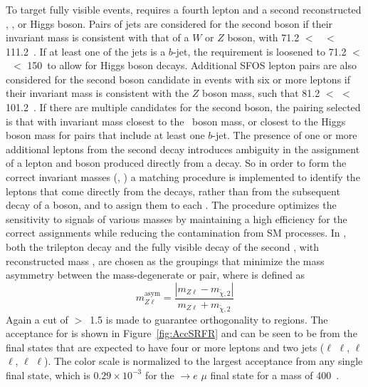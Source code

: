 \subsubsection{\SRFR}
\label{sec:srfr}
To target fully visible events, \SRTL requires a fourth lepton and a second reconstructed \Zboson, \Wboson, or Higgs boson.
Pairs of jets are considered for the second boson if their invariant mass \mjj is consistent with that of a $W$ or $Z$ boson, with 71.2 $<$ \mjj\ $<$ 111.2~\GeV.
If at least one of the jets is a $b$-jet, the \mjj requirement is loosened to 71.2 $<$ \mjj\ $<$ 150~\GeV to allow for Higgs boson decays.
Additional SFOS lepton pairs are also considered for the second boson candidate in events with six or more leptons if their invariant mass is consistent with the $Z$ boson mass, such that 81.2 $<$ \mll $<$ 101.2~\GeV.
If there are multiple candidates for the second boson, the pairing selected is that with invariant mass closest to the \Zboson\ boson mass, or closest to the Higgs boson mass for pairs that include at least one $b$-jet.
The presence of one or more additional leptons from the second \chono decay introduces ambiguity in the assignment of a lepton and boson produced directly from a \chono decay.
So in order to form the correct invariant masses (\mZl, \mBl) a matching procedure is implemented to identify the leptons that come directly from the \chono decays, rather than from the subsequent decay of a boson, and to assign them to each \chono.
The procedure optimizes the sensitivity to signals of various masses by maintaining a high efficiency for the correct assignments while reducing the contamination from SM processes.
In \SRFR, both the trilepton decay and the fully visible decay of the second \chono, with reconstructed mass \mBl, are chosen as the groupings that minimize the mass asymmetry between the mass-degenerate \CCsignal or \CNsignal pair, where \mZlAsym is defined as
\begin{equation}
  m_{Z\ell}^{\mathrm{asym}}= \frac{|m_{Z\ell} - m_{\tilde\chi,2}|}{m_{Z\ell} + m_{\tilde\chi,2}}
  \label{eq:asym}
\end{equation}
Again a cut of \dRbb$>$~1.5 is made to guarantee orthogonality to \ttZ regions.
The acceptance for \SRFR is shown in Figure~\ref{fig:AccSRFR} and can be seen to be from the final states that are expected to have four or more leptons and two jets (\Zboson$\ell$ \Wboson$\ell$, \Zboson$\ell$ \Hboson$\ell$, \Zboson$\ell$ \Zboson$\ell$).
The color scale is normalized to the largest acceptance from any single final state, which is $0.29 \times 10^{-3}$ for the \CCsignal$\rightarrow$\Zboson$e$ \Zboson$\mu$ final state for a \chone mass of 400~\GeV.   
